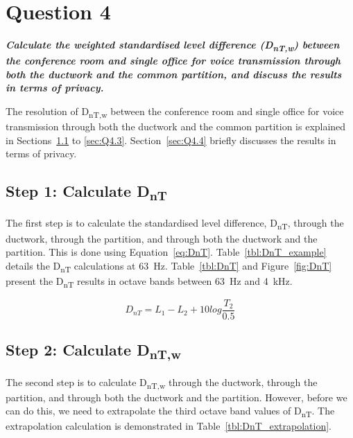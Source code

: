 \section{Question 4}

\textbf{\textit{Calculate the weighted standardised level difference (D\textsubscript{nT,w}) between the conference room and single office for voice transmission through both the ductwork and the common partition, and discuss the results in terms of privacy.}}


The resolution of D\textsubscript{nT,w} between the conference room and single office for voice transmission through both the ductwork and the common partition is explained in Sections~\ref{sec:Q4.1} to \ref{sec:Q4.3}.
Section~\ref{sec:Q4.4} briefly discusses the results in terms of privacy.



\subsection{Step 1: Calculate D\textsubscript{nT}} \label{sec:Q4.1}

The first step is to calculate the standardised level difference, D\textsubscript{nT}, through the ductwork, through the partition, and through both the ductwork and the partition.
This is done using Equation~\ref{eq:DnT}.
Table~\ref{tbl:DnT_example} details the D\textsubscript{nT} calculations at 63~Hz.
Table~\ref{tbl:DnT} and Figure~\ref{fig:DnT} present the D\textsubscript{nT} results in octave bands between 63~Hz and 4~kHz.

	\begin{equation}\label{eq:DnT}
		D_{nT} = L_1 - L_2 + 10 log \frac{T_2}{0.5}
	\end{equation}









\subsection{Step 2: Calculate D\textsubscript{nT,w}} \label{sec:Q4.2}

The second step is to calculate D\textsubscript{nT,w} through the ductwork, through the partition, and through both the ductwork and the partition.
However, before we can do this, we need to extrapolate the third octave band values of D\textsubscript{nT}.
The extrapolation calculation is demonstrated in Table~\ref{tbl:DnT_extrapolation}.

